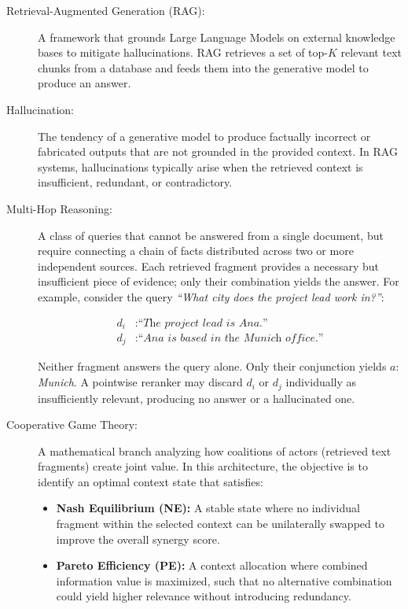 \begin{description}
    \item[Retrieval-Augmented Generation (RAG):] A framework that grounds 
    Large Language Models on external knowledge bases to mitigate 
    hallucinations. RAG retrieves a set of top-$K$ relevant text chunks 
    from a database and feeds them into the generative model to produce 
    an answer.

    \item[Hallucination:] The tendency of a generative model to produce 
    factually incorrect or fabricated outputs that are not grounded in 
    the provided context. In RAG systems, hallucinations typically arise 
    when the retrieved context is insufficient, redundant, or 
    contradictory.

    \item[Multi-Hop Reasoning:] A class of queries that cannot be
    answered from a single document, but require connecting a chain of
    facts distributed across two or more independent sources. Each
    retrieved fragment provides a necessary but insufficient piece of
    evidence; only their combination yields the answer. For example,
    consider the query \textit{``What city does the project lead work
    in?''}:

    \begin{align*}
        d_i &: \textit{``The project lead is Ana.''} \\
        d_j &: \textit{``Ana is based in the Munich office.''}
    \end{align*}

    Neither fragment answers the query alone. Only their
    conjunction yields $a$: \textit{Munich}. A pointwise reranker may
    discard $d_i$ or $d_j$ individually as insufficiently relevant,
    producing no answer or a hallucinated one.

    \item[Cooperative Game Theory:] A mathematical branch analyzing how 
    coalitions of actors (retrieved text fragments) create joint 
    value\cite{cooperativegametheory}. In this architecture, the 
    objective is to identify an optimal context state that satisfies:
    \begin{itemize}
        \item \textbf{Nash Equilibrium (NE):} A stable state where no 
        individual fragment within the selected context can be 
        unilaterally swapped to improve the overall synergy 
        score\cite{NE}.
        \item \textbf{Pareto Efficiency (PE):} A context allocation where 
        combined information value is maximized, such that no alternative 
        combination could yield higher relevance without introducing 
        redundancy\cite{PE}.
    \end{itemize}


\end{description}
